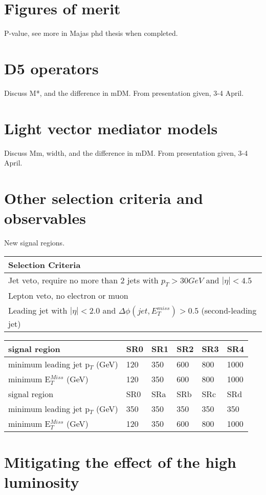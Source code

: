 \section{Figures of merit}
P-value, see more in Majas phd thesis when completed.
\section{D5 operators}
Discuss M*, and the difference in mDM. From presentation given, 3-4 April. 
\section{Light vector mediator models}
Discuss Mm, width, and the difference in mDM. From presentation given, 3-4 April.
\section{Other selection criteria and observables}
New signal regions.
\begin{table}[h]
\begin{center}
\begin{tabular}{l}
\hline
Selection Criteria \\ \hline
Jet veto, require no more than 2 jets with $p_T > 30 GeV$ and $|\eta| < 4.5$ \\
Lepton veto, no electron or muon \\
Leading jet with $|\eta| < 2.0$ and $\Delta \phi (jet, E_T^{miss})>0.5$ (second-leading jet) \\ \hline
\end{tabular}
\begin{tabular}{l l l l l l}
signal region & SR0 & SR1 & SR2 & SR3 & SR4 \\ \hline
minimum leading jet p$_T$ (GeV) & 120 & 350 & 600 & 800 & 1000 \\
minimum E$^{Miss}_T$ (GeV) & 120 & 350 & 600 & 800 & 1000 \\ \hline
signal region & SR0 & SRa & SRb & SRc & SRd \\ \hline
minimum leading jet p$_T$ (GeV) & 350 & 350 & 350 & 350 & 350 \\
minimum E$^{Miss}_T$ (GeV) & 120 & 350 & 600 & 800 & 1000 \\ \hline
\end{tabular}
\end{center}
\end{table}

\section{Mitigating the effect of the high luminosity}

